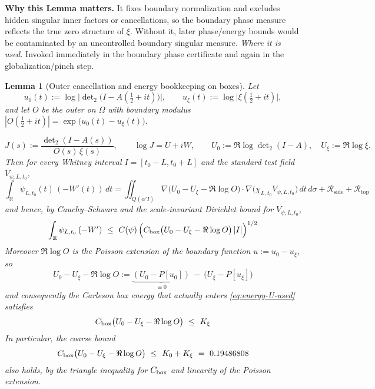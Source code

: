 \documentclass[11pt]{article}
\providecommand{\CboxZeta}{K_0 + K_\xi}%
\renewcommand{\CboxZeta}{0.19486808}
\newtheorem{lemma}{Lemma}[section]
\theoremstyle{definition}
\theoremstyle{remark}
\newcommand{\R}{\mathbb{R}}
\newcommand{\Poisson}{P}
\begin{document}
\vspace{1.0cm}
\noindent\textbf{Why this Lemma matters.} It fixes boundary normalization and excludes hidden singular inner factors or cancellations, so the boundary phase measure reflects the true zero structure of $\xi$. Without it, later phase/energy bounds would be contaminated by an uncontrolled boundary singular measure.
\noindent\textit{Where it is used.} Invoked immediately in the boundary phase certificate and again in the globalization/pinch step.
\begin{lemma}[Outer cancellation and energy bookkeeping on boxes]
\label{lem:outer-energy-bookkeeping}
Let
\[
u_0(t):=\log\Big|\det\nolimits_2\!\big(I-A(\tfrac12+it)\big)\Big|,\qquad
u_\xi(t):=\log\big|\xi(\tfrac12+it)\big|,
\]
and let $O$ be the outer on $\Omega$ with boundary modulus
\(
|O(\tfrac12+it)|=\exp\!\big(u_0(t)-u_\xi(t)\big).
\)
 
\[
J(s):=\frac{\det\nolimits_2(I-A(s))}{O(s)\,\xi(s)},\qquad
\log J=U+iW,\qquad U_0:=\Re\log\det\nolimits_2(I-A),\quad U_\xi:=\Re\log\xi.
\]
Then for every Whitney interval $I=[t_0-L,t_0+L]$ and the standard test field $V_{\psi,L,t_0}$,
\begin{equation}\label{eq:CRG-outer-cancel}
\int_{\R}\psi_{L,t_0}(t)\,(-W'(t))\,dt
=\iint_{Q(\alpha' I)} \nabla\!\big(U_0-U_\xi-\Re\log O\big)\cdot\nabla\!\big(\chi_{L,t_0}V_{\psi,L,t_0}\big)\,dt\,d\sigma
+\mathcal R_{\mathrm{side}}+\mathcal R_{\mathrm{top}}
\end{equation}
and hence, by Cauchy--Schwarz and the scale‑invariant Dirichlet bound for $V_{\psi,L,t_0}$,
\begin{equation}\label{eq:energy-U-used}
\int_{\R}\psi_{L,t_0}\,(-W')\ \le\ C(\psi)\,\Big(C_{\rm box}\big(U_0-U_\xi-\Re\log O\big)\,|I|\Big)^{1/2}
\end{equation}
Moreover $\Re\log O$ is the Poisson extension of the boundary function $u:=u_0-u_\xi$, so
\begin{equation}\label{eq:Poisson-splitting}
U_0-U_\xi-\Re\log O
:=\underbrace{(U_0-\Poisson[u_0])}_{\equiv 0}\ -\ \big(U_\xi-\Poisson[u_\xi]\big)
\end{equation}
and consequently the Carleson box energy that actually enters \eqref{eq:energy-U-used} satisfies
\begin{equation}\label{eq:sharp-Kxi}
C_{\rm box}\big(U_0-U_\xi-\Re\log O\big)\ \le\ K_\xi
\end{equation}
In particular, the coarse bound
\begin{equation}\label{eq:coarse-K0Kxi}
C_{\rm box}\big(U_0-U_\xi-\Re\log O\big)\ \le\ K_0+K_\xi\ =\ \CboxZeta
\end{equation}
also holds, by the triangle inequality for $C_{\rm box}$ and linearity of the Poisson extension.
\end{lemma}
\end{document}
